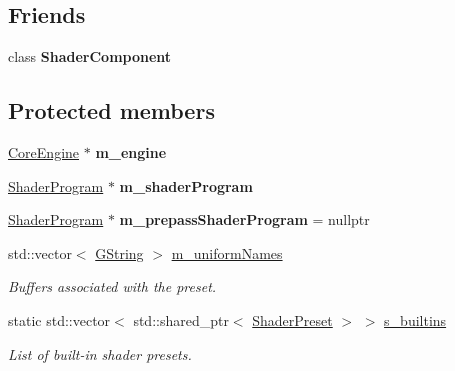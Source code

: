 \subsection*{Friends}
\begin{DoxyCompactItemize}
\item 
\mbox{\label{classrev_1_1_shader_preset_afa882c41e7312a549c1cc373dab085ed}} 
class {\bfseries Shader\+Component}
\end{DoxyCompactItemize}
\subsection*{Protected members}
\begin{DoxyCompactItemize}
\item 
\mbox{\label{classrev_1_1_shader_preset_ae32094ae974bea52c26062eb19c43e19}} 
\mbox{\hyperlink{classrev_1_1_core_engine}{Core\+Engine}} $\ast$ {\bfseries m\+\_\+engine}
\item 
\mbox{\label{classrev_1_1_shader_preset_a1ac6f32d24bbc5de7f85fb1612349662}} 
\mbox{\hyperlink{classrev_1_1_shader_program}{Shader\+Program}} $\ast$ {\bfseries m\+\_\+shader\+Program}
\item 
\mbox{\label{classrev_1_1_shader_preset_a89682a8b8b7d0b286d1f1f3a4b207e99}} 
\mbox{\hyperlink{classrev_1_1_shader_program}{Shader\+Program}} $\ast$ {\bfseries m\+\_\+prepass\+Shader\+Program} = nullptr
\item 
std\+::vector$<$ \mbox{\hyperlink{classrev_1_1_g_string}{G\+String}} $>$ \mbox{\hyperlink{classrev_1_1_shader_preset_a53dc7afd60ed65e3fb20c1c3a99be92b}{m\+\_\+uniform\+Names}}
\begin{DoxyCompactList}\small\item\em Buffers associated with the preset. \end{DoxyCompactList}\item 
\mbox{\label{classrev_1_1_shader_preset_accb9ec5aa5802502da69b4550185ff31}} 
static std\+::vector$<$ std\+::shared\+\_\+ptr$<$ \mbox{\hyperlink{classrev_1_1_shader_preset}{Shader\+Preset}} $>$ $>$ \mbox{\hyperlink{classrev_1_1_shader_preset_accb9ec5aa5802502da69b4550185ff31}{s\+\_\+builtins}}
\begin{DoxyCompactList}\small\item\em List of built-\/in shader presets. \end{DoxyCompactList}\end{DoxyCompactItemize}
